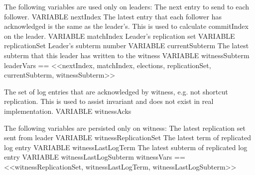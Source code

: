 \documentclass{standalone}
\begin{document}
\onehalfspacing

    \begin{tla}

\* The following variables are used only on leaders:
\* The next entry to send to each follower.
VARIABLE nextIndex
\* The latest entry that each follower has acknowledged is the same as the
\* leader's. This is used to calculate commitIndex on the leader.
VARIABLE matchIndex
\* Leader's replication set
VARIABLE replicationSet
\* Leader's subterm number
VARIABLE currentSubterm
\* The latest subterm that this leader has written to the witness
VARIABLE witnessSubterm
leaderVars == <<nextIndex, matchIndex, elections, 
                replicationSet, currentSubterm, witnessSubterm>>

\* The set of log entries that are acknowledged by witness, e.g. not shortcut replication. 
\* This is used to assist invariant and does not exist in real implementation.
VARIABLE witnessAcks

\* The following variables are persisted only on witness:
\* The latest replication set sent from leader
VARIABLE witnessReplicationSet
\* The latest term of replicated log entry
VARIABLE witnessLastLogTerm
\* The latest subterm of replicated log entry
VARIABLE witnessLastLogSubterm
witnessVars == <<witnessReplicationSet, 
                 witnessLastLogTerm, witnessLastLogSubterm>>

    \end{tla}
\begin{tlatex}
\@x{}%
%
\@xx{}%
\@x{}%
%
\@xx{}%
%
\@x{}%
%
\@xx{}%
\@x{}%
%
\@xx{}%
%
\@x{}%
%
\@xx{}%
%
\@x{}%
%
\@xx{}%
%
\@x{}%
%
\@xx{}%
%
%
\@pvspace{8.0pt}%
\@x{}%
%
\@xx{}%
\@x{}%
%
\@xx{}%
%
\@pvspace{8.0pt}%
\@x{}%
%
\@xx{}%
\@x{}%
%
\@xx{}%
%
\@x{}%
%
\@xx{}%
%
\@x{}%
%
\@xx{}%
%
%
%
\@pvspace{8.0pt}%
\end{tlatex}
\end{document}
